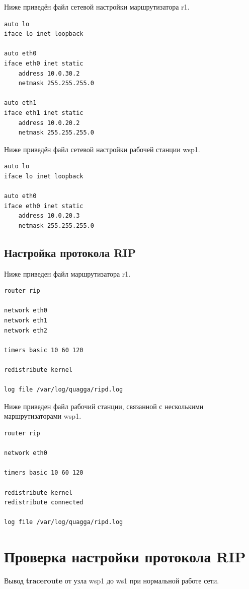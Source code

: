 \documentclass[a4paper,12pt]{article}
\begin{document}
Ниже приведён файл сетевой настройки маршрутизатора r1.

\begin{Verbatim}
auto lo
iface lo inet loopback

auto eth0
iface eth0 inet static
	address 10.0.30.2
	netmask 255.255.255.0

auto eth1
iface eth1 inet static
	address 10.0.20.2
	netmask 255.255.255.0
\end{Verbatim}

Ниже приведён файл сетевой настройки рабочей станции wsp1.

\begin{Verbatim}
auto lo
iface lo inet loopback

auto eth0
iface eth0 inet static
	address 10.0.20.3
	netmask 255.255.255.0
\end{Verbatim}

\subsection{Настройка протокола RIP}

Ниже приведен файл  маршрутизатора r1.

\begin{Verbatim}
router rip

network eth0
network eth1
network eth2

timers basic 10 60 120

redistribute kernel

log file /var/log/quagga/ripd.log
\end{Verbatim}

Ниже приведен файл  рабочий станции, связанной с несколькими маршрутизаторами wsp1.

\begin{Verbatim}
router rip

network eth0

timers basic 10 60 120

redistribute kernel
redistribute connected

log file /var/log/quagga/ripd.log
\end{Verbatim}


\section{Проверка настройки протокола RIP}

Вывод \textbf{traceroute} от узла wsp1 до ws1 при нормальной работе сети.
\end{document}
